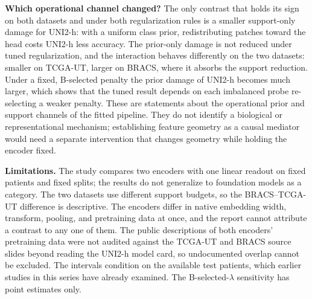 \textbf{Which operational channel changed?} The only contrast that holds its sign on both datasets and under both regularization rules is a smaller support-only damage for UNI2-h: with a uniform class prior, redistributing patches toward the head costs UNI2-h less accuracy. The prior-only damage is not reduced under tuned regularization, and the interaction behaves differently on the two datasets: smaller on TCGA-UT, larger on BRACS, where it absorbs the support reduction. Under a fixed, B-selected penalty the prior damage of UNI2-h becomes much larger, which shows that the tuned result depends on each imbalanced probe re-selecting a weaker penalty. These are statements about the operational prior and support channels of the fitted pipeline. They do not identify a biological or representational mechanism; establishing feature geometry as a causal mediator would need a separate intervention that changes geometry while holding the encoder fixed.

\textbf{Limitations.} The study compares two encoders with one linear readout on fixed patients and fixed splits; the results do not generalize to foundation models as a category. The two datasets use different support budgets, so the BRACS--TCGA-UT difference is descriptive. The encoders differ in native embedding width, transform, pooling, and pretraining data at once, and the report cannot attribute a contrast to any one of them. The public descriptions of both encoders' pretraining data were not audited against the TCGA-UT and BRACS source slides beyond reading the UNI2-h model card, so undocumented overlap cannot be excluded. The intervals condition on the available test patients, which earlier studies in this series have already examined. The B-selected-$\lambda$ sensitivity has point estimates only.
